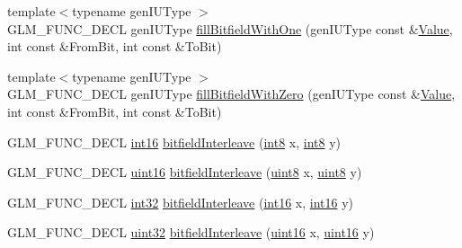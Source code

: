 \begin{DoxyCompactItemize}
\item 
{\footnotesize template$<$typename gen\+I\+U\+Type $>$ }\\G\+L\+M\+\_\+\+F\+U\+N\+C\+\_\+\+D\+E\+CL gen\+I\+U\+Type \hyperlink{group__gtx__bit_gafac2a9e0ef0d5d2fc4e569bff2b2f452}{fill\+Bitfield\+With\+One} (gen\+I\+U\+Type const \&\hyperlink{document_8h_a071cf97155ba72ac9a1fc4ad7e63d481}{Value}, int const \&From\+Bit, int const \&To\+Bit)
\item 
{\footnotesize template$<$typename gen\+I\+U\+Type $>$ }\\G\+L\+M\+\_\+\+F\+U\+N\+C\+\_\+\+D\+E\+CL gen\+I\+U\+Type \hyperlink{group__gtx__bit_ga0c514d45387003260783ba6a8a4f3285}{fill\+Bitfield\+With\+Zero} (gen\+I\+U\+Type const \&\hyperlink{document_8h_a071cf97155ba72ac9a1fc4ad7e63d481}{Value}, int const \&From\+Bit, int const \&To\+Bit)
\item 
G\+L\+M\+\_\+\+F\+U\+N\+C\+\_\+\+D\+E\+CL \hyperlink{group__gtc__type__precision_ga2945a61d12771f8954994fcddf02b021}{int16} \hyperlink{group__gtx__bit_ga479134317bc95d99f2b2e235d3db287b}{bitfield\+Interleave} (\hyperlink{group__gtc__type__precision_ga96254f9c1c4506fc8eb5cf3301ce8565}{int8} x, \hyperlink{group__gtc__type__precision_ga96254f9c1c4506fc8eb5cf3301ce8565}{int8} y)
\item 
G\+L\+M\+\_\+\+F\+U\+N\+C\+\_\+\+D\+E\+CL \hyperlink{group__gtc__type__precision_gad8c2939e1fdd8e5828b31d95c52255d5}{uint16} \hyperlink{group__gtx__bit_ga0700a3ceb088a0ecc23d76c154096061}{bitfield\+Interleave} (\hyperlink{group__gtc__type__precision_ga1a7dcd8aac97cc8020817c94049deff2}{uint8} x, \hyperlink{group__gtc__type__precision_ga1a7dcd8aac97cc8020817c94049deff2}{uint8} y)
\item 
G\+L\+M\+\_\+\+F\+U\+N\+C\+\_\+\+D\+E\+CL \hyperlink{group__gtc__type__precision_ga632d8b25f6b61659f39ea4321fab92a4}{int32} \hyperlink{group__gtx__bit_ga1a0264598647ae00a596865af4e1e878}{bitfield\+Interleave} (\hyperlink{group__gtc__type__precision_ga2945a61d12771f8954994fcddf02b021}{int16} x, \hyperlink{group__gtc__type__precision_ga2945a61d12771f8954994fcddf02b021}{int16} y)
\item 
G\+L\+M\+\_\+\+F\+U\+N\+C\+\_\+\+D\+E\+CL \hyperlink{group__gtc__type__precision_ga202b6a53c105fcb7e531f9b443518451}{uint32} \hyperlink{group__gtx__bit_ga19ef8360379483e3ee245e89cb62ff93}{bitfield\+Interleave} (\hyperlink{group__gtc__type__precision_gad8c2939e1fdd8e5828b31d95c52255d5}{uint16} x, \hyperlink{group__gtc__type__precision_gad8c2939e1fdd8e5828b31d95c52255d5}{uint16} y)
\item 

\end{DoxyCompactItemize}
